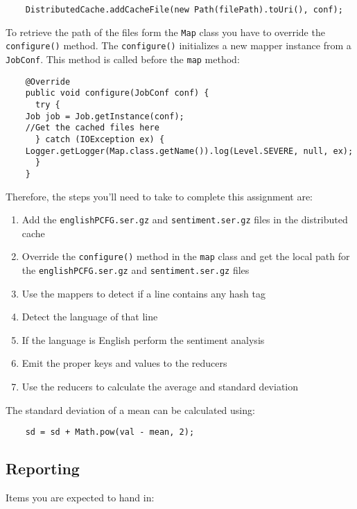 \documentclass[a4paper,10pt]{article}
\begin{document}
  \begin{lstlisting}
    DistributedCache.addCacheFile(new Path(filePath).toUri(), conf);
  \end{lstlisting}
  
  To retrieve the path of the files form the \texttt{Map} class you have to override the \texttt{configure()} method. The \texttt{configure()} initializes a new mapper instance from a \texttt{JobConf}. This method is called before the \texttt{map} method:
  \begin{lstlisting}
    @Override
    public void configure(JobConf conf) {
      try {
	Job job = Job.getInstance(conf);
	//Get the cached files here
      } catch (IOException ex) {
	Logger.getLogger(Map.class.getName()).log(Level.SEVERE, null, ex);
      }
    }
  \end{lstlisting}
  
  Therefore, the steps you'll need to take to complete this assignment are: 
  
  \begin{enumerate}
    \item Add the \texttt{englishPCFG.ser.gz}  and \texttt{sentiment.ser.gz} files in the distributed cache
    \item Override the \texttt{configure()} method in the \texttt{map} class and get the local path for the \texttt{englishPCFG.ser.gz}  and \texttt{sentiment.ser.gz} files
    \item Use the mappers to detect if a line contains any hash tag
    \item Detect the language of that line 
    \item If the language is English perform the sentiment analysis
    \item Emit the proper keys and values to the reducers 
    \item Use the reducers to calculate the average and standard deviation 
  \end{enumerate}
  
  The standard deviation of a mean can be calculated using: 
  \begin{lstlisting}
    sd = sd + Math.pow(val - mean, 2);
  \end{lstlisting}
  
  
  \subsection{Reporting} \label{sec:report}
  Items you are expected to hand in:
  
\end{document}
